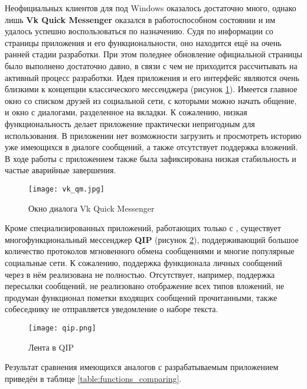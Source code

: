 Неофициальных клиентов для \vk{} под Windows оказалось достаточно много, однако
лишь \textbf{Vk Quick Messenger} оказался в работоспособном состоянии и им
удалось успешно воспользоваться по назначению. Судя по информации со страницы
приложения и его функциональности, оно находится ещё на очень ранней стадии
разработки. При этом поледнее обновление официальной страницы было выполнено
достаточно давно, в связи с чем не приходится рассчитывать на активный процесс
разработки. Идея приложения и его интерфейс являются очень близкими к концепции
классического мессенджера (рисунок \ref{fig:vk_qm}). Имеется главное окно со
списком друзей из социальной сети, с которыми можно начать общение, и окно с
диалогами, разделенное на вкладки.
К сожалению, низкая функциональность делает приложение практически непригодным
для использования.
В приложении нет возможности загрузить и просмотреть историю уже имеющихся в
диалоге сообщений, а также отсутствует поддержка вложений. В ходе работы с
приложением также была зафиксирована низкая стабильность и частые аварийные
завершения.

\begin{figure}[ht] \centering \texttt{[image: vk\_qm.jpg]}
	\caption{Окно диалога Vk Quick Messenger}
	\label{fig:vk_qm}
\end{figure}

Кроме специализированных приложений, работающих только с \vk{}, существует
многофункциональный мессенджер \textbf{QIP} (рисунок \ref{fig:qip}),
поддерживающий большое количество протоколов мгновенного обмена сообщениями и
многие популярные социальные сети.
К сожалению, поддержка функционала личных сообщений через \vk{} в нём
реализована не полностью.
Отсутствует, например, поддержка пересылки сообщений, не реализовано отображение
всех типов вложений, не продуман функционал пометки входящих сообщений
прочитанными, также собеседнику не отправляется уведомление о наборе текста.

\begin{figure}[hb!] \centering \texttt{[image: qip.png]}
	\caption{Лента \vk{} в QIP}
	\label{fig:qip}
\end{figure}

Результат сравнения имеющихся аналогов с разрабатываемым приложением \vkapp{}
приведён в таблице \ref{table:functions_comparing}.

